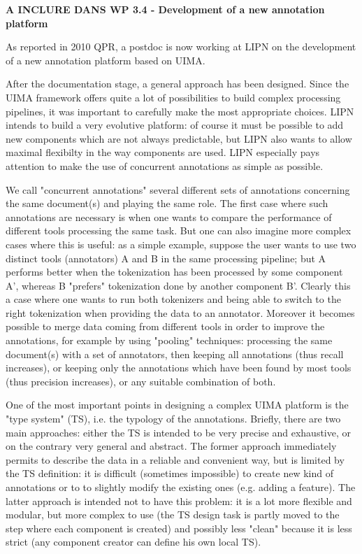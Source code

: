 
{\bf A INCLURE DANS WP 3.4 - Development of a new annotation platform}

As reported in 2010 QPR, a postdoc is now working at LIPN on the development of a new annotation platform based on UIMA. 

After the documentation stage, a general approach has been designed. Since the UIMA framework offers quite a lot of possibilities to build complex processing pipelines, it was important to carefully make the most appropriate choices. LIPN intends to build a very evolutive platform: of course it must be possible to add new components which are not always predictable, but LIPN also wants to allow maximal flexibilty in the way components are used. LIPN especially pays attention to make the use of concurrent annotations as simple as possible. 

We call "concurrent annotations" several different sets of annotations concerning the same document(s) and playing the same role. The first case where such annotations are necessary is when one wants to compare the performance of different tools processing the same task. But one can also imagine more complex cases where this is useful: as a simple example, suppose the user wants to use two distinct tools (annotators) A and B in the same processing pipeline; but A performs better when the tokenization has been processed by some component A', whereas B "prefers" tokenization done by another component B'. Clearly this a case where one wants to run both tokenizers and being able to switch to the right tokenization when providing the data to an annotator. Moreover it becomes possible to merge data coming from different tools in order to improve the annotations, for example by using "pooling" techniques: processing the same document(s) with a set of annotators, then keeping all annotations (thus recall increases), or keeping only the annotations which have been found by most tools (thus precision increases), or any suitable combination of both.

One of the most important points in designing a complex UIMA platform is the "type system" (TS), i.e. the typology of the annotations. Briefly, there are two main approaches: either the TS is intended to be very precise and exhaustive, or on the contrary very general and abstract. The former approach immediately permits to describe the data in a reliable and convenient way, but is limited by the TS definition: it is difficult (sometimes impossible) to create new kind of annotations or to to slightly modify the existing ones (e.g. adding a feature). The latter approach is intended not to have this problem: it is a lot more flexible and modular, but more complex to use (the TS design task is partly moved to the step where each component is created) and possibly less "clean" because it is less strict (any component creator can define his own local TS).

